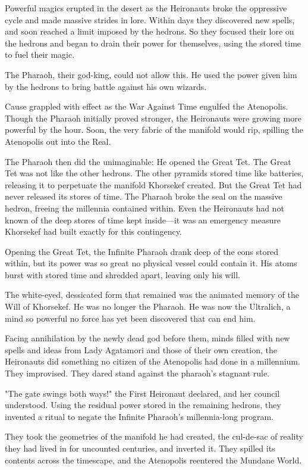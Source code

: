 \documentclass[10pt,a4paper,twoside,bg=print,twocolumn,openany,nodeprecatedcode]{dndbook}
\begin{document}
Powerful magics erupted in the desert as the Heironauts broke the oppressive cycle and made massive strides in lore. Within days they discovered new spells, and soon reached a limit imposed by the hedrons. So they focused their lore on the hedrons and began to drain their power for themselves, using the stored time to fuel their magic.

The Pharaoh, their god-king, could not allow this. He used the power given him by the hedrons to bring battle against his own wizards.

Cause grappled with effect as the War Against Time engulfed the Atenopolis. Though the Pharaoh initially proved stronger, the Heironauts were growing more powerful by the hour. Soon, the very fabric of the manifold would rip, spilling the Atenopolis out into the Real.

The Pharaoh then did the unimaginable: He opened the Great Tet. The Great Tet was not like the other hedrons. The other pyramids stored time like batteries, releasing it to perpetuate the manifold Khorsekef created. But the Great Tet had never released its stores of time. The Pharaoh broke the seal on the massive hedron, freeing the millennia contained within. Even the Heironauts had not known of the deep stores of time kept inside—it was an emergency measure Khorsekef had built exactly for this contingency.

Opening the Great Tet, the Infinite Pharaoh drank deep of the eons stored within, but its power was so great no physical vessel could contain it. His atoms burst with stored time and shredded apart, leaving only his will.

The white-eyed, dessicated form that remained was the animated memory of the Will of Khorsekef. He was no longer the Pharaoh. He was now the Ultralich, a mind so powerful no force has yet been discovered that can end him.

Facing annihilation by the newly dead god before them, minds filled with new spells and ideas from Lady Agatamori and those of their own creation, the Heironauts did something no citizen of the Atenopolis had done in a millennium. They improvised. They dared stand against the pharaoh's stagnant rule.

"The gate swings both ways!" the First Heironaut declared, and her council understood. Using the residual power stored in the remaining hedrons, they invented a ritual to negate the Infinite Pharaoh's millennia-long program.

They took the geometries of the manifold he had created, the cul-de-sac of reality they had lived in for uncounted centuries, and inverted it. They spilled its contents across the timescape, and the Atenopolis reentered the Mundane World.
\end{document}
